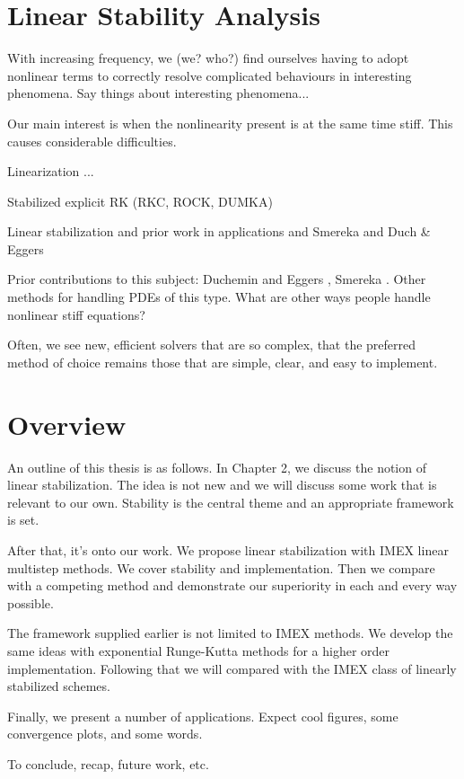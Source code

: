 \section{Linear Stability Analysis}



With increasing frequency, we (we? who?) find ourselves having to adopt nonlinear terms to correctly resolve complicated behaviours in interesting phenomena. Say things about interesting phenomena...

Our main interest is when the nonlinearity present is at the same time stiff. This causes considerable difficulties. 

Linearization ...

Stabilized explicit RK (RKC, ROCK, DUMKA)

Linear stabilization and prior work in applications and Smereka and Duch \& Eggers

Prior contributions to this subject: Duchemin and Eggers \cite{duchemin2014explicit}, Smereka \cite{smereka2003semi}. Other methods for handling PDEs of this type.
What are other ways people handle nonlinear stiff equations? 

Often, we see new, efficient solvers that are so complex, that the preferred method of choice remains those that are simple, clear, and easy to implement. 

\section{Overview}
An outline of this thesis is as follows. In Chapter 2, we discuss the notion of linear stabilization. The idea is not new and we will discuss some work that is relevant to our own. Stability is the central theme and an appropriate framework is set. 

After that, it's onto our work. We propose linear stabilization with IMEX linear multistep methods. We cover stability and implementation. Then we compare with a competing method and demonstrate our superiority in each and every way possible.

The framework supplied earlier is not limited to IMEX methods. We develop the same ideas with exponential Runge-Kutta methods for a higher order implementation. Following that we will compared with the IMEX class of linearly stabilized schemes.

Finally, we present a number of applications. Expect cool figures, some convergence plots, and some words.

To conclude, recap, future work, etc.